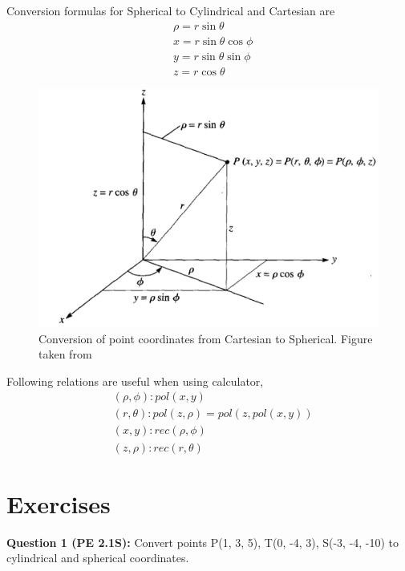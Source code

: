 \documentclass[12pt,a4paper]{article}
\begin{document}
Conversion formulas for Spherical to Cylindrical and Cartesian are
\begin{equation}
\begin{split}
&\rho = r\sin\theta\\
&x = r\sin\theta\cos\phi\\
&y = r\sin\theta\sin\phi\\
&z = r\cos\theta
\end{split}
\end{equation}
\begin{figure}[H]
\centering
\includegraphics[scale=0.45]{Figure2-5S.png}
\caption{Conversion of point coordinates from Cartesian to Spherical. Figure taken from~\cite[Figure 2.5, page 33]{Sadiku}}
\label{Cartesian-to-Spherical}
\end{figure}
Following relations are useful when using calculator,
\begin{equation*}
\begin{split}
&(\rho, \phi): pol(x,y)\\
&(r, \theta): pol(z, \rho) = pol(z, pol(x, y))\\
&(x, y): rec(\rho, \phi)\\
&(z, \rho): rec(r, \theta)
\end{split}
\end{equation*}
\section{Exercises}
\noindent\textbf{Question 1 (PE 2.1S):} Convert points P(1, 3, 5), T(0, -4, 3), S(-3, -4, -10) to cylindrical and spherical coordinates.


\end{document}
